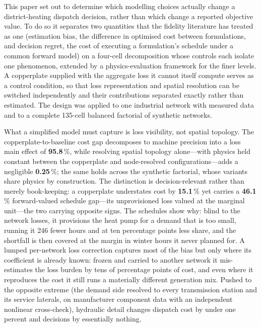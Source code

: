 
This paper set out to determine which modelling choices actually change a district-heating
dispatch decision, rather than which change a reported objective value. To do so it
separates two quantities that the fidelity literature has treated as one (estimation
bias, the difference in optimised cost between formulations, and decision regret, the cost
of executing a formulation's schedule under a common forward model) on a four-cell
decomposition whose controls each isolate one phenomenon, extended by a physics-evaluation
framework for the finer levels. A copperplate supplied with the
aggregate loss it cannot itself compute serves as a control condition, so that loss
representation and spatial resolution can be switched independently and their contributions
separated exactly rather than estimated. The design was applied to one industrial network
with measured data and to a complete 135-cell balanced factorial of synthetic networks.

What a simplified model must capture is loss visibility, not spatial topology. The
copperplate-to-baseline cost gap decomposes to machine precision into a loss main effect of
\textbf{95.8}\,\%, while resolving spatial topology alone---with physics held constant between the
copperplate and node-resolved configurations---adds a negligible \textbf{0.25}\,\%; the same holds
across the synthetic factorial, whose variants share physics by construction. The distinction is
decision-relevant rather than merely book-keeping: a copperplate understates cost by
\textbf{15.1}\,\% yet carries a \textbf{46.1}\,\% forward-valued schedule gap---its
unprovisioned loss valued at the marginal unit---the two carrying opposite signs. The schedules show why: blind to the network losses, it provisions the heat pump
for a demand that is too small, running it 246 fewer hours and at ten percentage points less
share, and the shortfall is then covered at the margin in winter hours it never planned for. A lumped
per-network loss correction captures most of the bias but only where its coefficient is
already known: frozen and carried to another network it mis-estimates the loss burden by
tens of percentage points of cost, and even where it reproduces the cost it still runs a
materially different generation mix. Pushed to the opposite extreme (the demand side
resolved to every transmission station and its service laterals, on manufacturer component
data with an independent nonlinear cross-check), hydraulic detail changes dispatch cost by
under one percent and decisions by essentially nothing.

